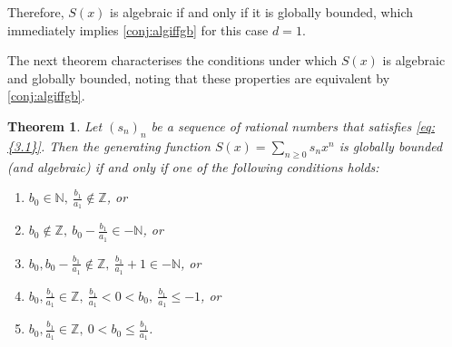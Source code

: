 \documentclass[11pt]{article}
\theoremstyle{definition}
\theoremstyle{plain}
\newtheorem{thm}[defi]{Theorem}
\theoremstyle{remark}
\begin{document}
Therefore, $S(x)$ is algebraic if and only if it is globally bounded, which immediately implies \cref{conj:algiffgb} for this case $d=1$.

The next theorem characterises the conditions under which $S(x)$ is algebraic and globally bounded, noting that these properties are equivalent by \cref{conj:algiffgb}.

\begin{thm}\label{thm:gbhyper}
Let $(s_n)_n$ be a sequence of rational numbers that satisfies \eqref{eq:{3.1}}. Then the generating function $S(x) = \sum\limits_{n\geq0} s_nx^n$ is globally bounded (and algebraic) if and only if one of the following conditions holds:
\begin{enumerate}
  \item $b_0\in\mathbb N,\ \frac{b_1}{a_1}\notin\mathbb Z$, or 
  \item $b_0\notin\mathbb Z,\ b_0-\frac{b_1}{a_1}\in-\mathbb N$, or 
  \item $b_0,b_0-\frac{b_1}{a_1}\notin\mathbb Z,\ \frac{b_1}{a_1}+1\in-\mathbb N$, or 
  \item $b_0,\frac{b_1}{a_1}\in\mathbb Z,\  \frac{b_1}{a_1}<0<b_0, \ \frac{b_1}{a_1}\le -1$, or
  \item $b_0,\frac{b_1}{a_1}\in\mathbb Z,\  0 < b_0\leq\frac{b_1}{a_1}$.
\end{enumerate}
\end{thm}
\end{document}
